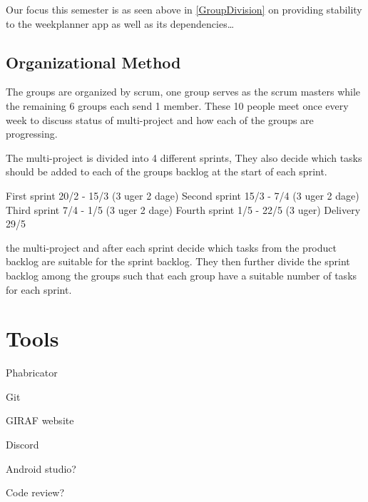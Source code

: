 Our focus this semester is as seen above in \autoref{GroupDivision} on
providing stability to the weekplanner app as well as its dependencies\ldots



\subsection{Organizational Method}

The groups are organized by scrum, one group serves as the scrum masters while
the remaining 6 groups each send 1 member. These 10 people meet once every week
to discuss status of multi-project and how each of the groups are progressing.


The multi-project is divided into 4 different sprints,
They also decide which tasks should be added to each of the groups backlog at
the start of each sprint.


First sprint 20/2 - 15/3 	(3 uger 2 dage)
Second sprint 15/3 - 7/4 	(3 uger 2 dage)
Third sprint 7/4 - 1/5		(3 uger 2 dage)
Fourth sprint 1/5 - 22/5 	(3 uger)
Delivery 29/5


the
multi-project and after each sprint decide which tasks from the product backlog are suitable
for the sprint backlog. They then further divide the sprint backlog among the
groups such that each group have a suitable number of tasks for each sprint.\nl


\section{Tools}

Phabricator

Git

GIRAF website

Discord

Android studio?

Code review?


